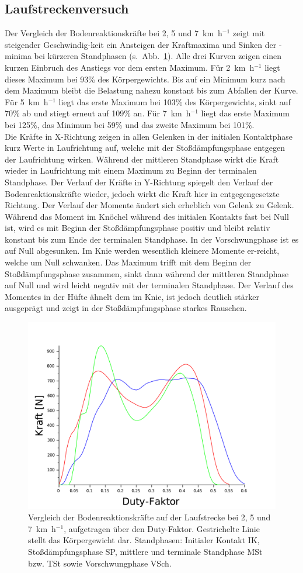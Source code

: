 \subsection{Laufstreckenversuch}
\vspace{-3pt}
Der Vergleich der Bodenreaktionskräfte bei 2, 5 und 7~km~h$^{-1}$ zeigt mit steigender Geschwindig-keit ein Ansteigen der Kraftmaxima und Sinken der -minima bei kürzeren Standphasen (s.~Abb.~\ref{fig:res_Kraefte}). Alle drei Kurven zeigen einen kurzen Einbruch des Anstiegs vor dem ersten Maximum. Für 2~km~h$^{-1}$ liegt dieses Maximum bei 93\% des Körpergewichts. Bis auf ein Minimum kurz nach dem Maximum bleibt die Belastung nahezu konstant bis zum Abfallen der Kurve. Für 5~km~h$^{-1}$ liegt das erste Maximum bei 103\% des Körpergewichts, sinkt auf 70\% ab und stiegt erneut auf 109\% an. Für 7~km~h$^{-1}$ liegt das erste Maximum bei 125\%, das Minimum bei 59\% und das zweite Maximum bei 101\%.\\
Die Kräfte in X-Richtung zeigen in allen Gelenken in der initialen Kontaktphase kurz Werte in Laufrichtung auf, welche mit der Stoßdämpfungsphase entgegen der Laufrichtung wirken. Während der mittleren Standphase wirkt die Kraft wieder in Laufrichtung mit einem Maximum zu Beginn der terminalen Standphase. Der Verlauf der Kräfte in Y-Richtung spiegelt den Verlauf der Bodenreaktionskräfte wieder, jedoch wirkt die Kraft hier in entgegengesetzte Richtung. Der Verlauf der Momente ändert sich erheblich von Gelenk zu Gelenk. Während das Moment im Knöchel während des initialen Kontakts fast bei Null ist, wird es mit Beginn der Stoßdämpfungsphase positiv und bleibt relativ konstant bis zum Ende der terminalen Standphase. In der Vorschwungphase ist es auf Null abgesunken. Im Knie werden wesentlich kleinere Momente er-reicht, welche um Null schwanken. Das Maximum trifft mit dem Beginn der Stoßdämpfungsphase zusammen, sinkt dann während der mittleren Standphase auf Null und wird leicht negativ mit der terminalen Standphase. Der Verlauf des Momentes in der Hüfte ähnelt dem im Knie, ist jedoch deutlich stärker ausgeprägt und zeigt in der Stoßdämpfungsphase starkes Rauschen.
\begin{figure}
	\centering
	\includegraphics[width=0.7\linewidth]{bilder/Ergebnisse/BRK}
	\caption[Bodenreaktionskräfte]{Vergleich der Bodenreaktionskräfte auf der Laufstrecke bei 2, 5 und 7~km~h$^{-1}$, aufgetragen über den Duty-Faktor. Gestrichelte Linie stellt das Körpergewicht dar. Standphasen: Initialer Kontakt IK, Stoßdämpfungsphase SP, mittlere und terminale Standphase MSt bzw. TSt sowie Vorschwungphase VSch.}
	\label{fig:res_Kraefte}
\end{figure}%
